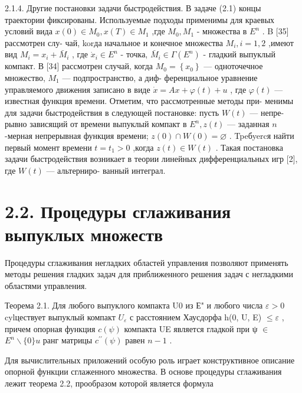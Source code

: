 \documentclass[10pt]{article}
\begin{document}
2.1.4. Другие постановки задачи быстродействия. В задаче (2.1) концы траектории фиксированы. Используемые подходы применимы для краевых условий вида \(x\left( 0\right)  \in  {M}_{0},x\left( T\right)  \in  {M}_{1}\) ,где \({M}_{0},{M}_{1}\) - множества в \({E}^{n}\) . B [35] рассмотрен слу- чай, korда начальное и конечное множества \({M}_{i},i = 1,2\) ,имеют вид \({M}_{i} = {x}_{i} + {\bar{M}}_{i}\) , где \({\dot{x}}_{i} \in  {E}^{n}\) - точка, \({\bar{M}}_{i} \in  \Gamma \left( {E}^{n}\right)\) - гладкий выпуклый компакт. В [34] рассмотрен случай, когда \({M}_{0} = \left\{  {x}_{0}\right\}\) — одноточечное множество, \({M}_{1}\) — подпространство, а диф- ференциальное уравнение управляемого движения записано в виде \(\dot{x} = {Ax} + \varphi \left( t\right)  + u\) , где \(\varphi \left( t\right)\) — известная функция времени. Отметим, что рассмотренные методы при- менимы для задачи быстродействия в следующей постановке: пусть \(W\left( t\right)\) — непре- рывно зависящий от времени выпуклый компакт в \({E}^{n},z\left( t\right)\) — заданная \(n\) -мерная непрерывная функция времени; \(z\left( 0\right)  \cap  W\left( 0\right)  = \varnothing\) . Tpeбyercя найти первый момент времени \(t = {t}_{1} > 0\) ,когда \(z\left( t\right)  \in  W\left( t\right)\) . Такая постановка задачи быстродействия возникает в теории линейных дифференциальных игр [2], где \(W\left( t\right)\) — альтерниро- ванный интеграл.

\section*{2.2. Процедуры сглаживания выпуклых множеств}

Процедуры сглаживания негладких областей управления позволяют применять методы решения гладких задач для приближенного решения задач с негладкими областями управления.

Теорема 2.1. Для любого выпуклого компакта U0 из Е" и любого числа \(\varepsilon  > 0\) cylцествует выпуклый компакт \({U}_{\varepsilon }\) с расстоянием Хаусдорфа h(0, U, E) \(\leq  \varepsilon\) , причем опорная функция \(c\left( \psi \right)\) компакта UE является гладкой при ψ \(\in\) \({E}^{n} \smallsetminus  \{ 0\} u\) ранг матрицы \({c}^{\prime \prime }\left( \psi \right)\) равен \(n - 1\) .

Для вычислительных приложений особую роль играет конструктивное описание опорной функции сглаженного множества. В основе процедуры сглаживания лежит теорема 2.2, прообразом которой является формула
\end{document}
